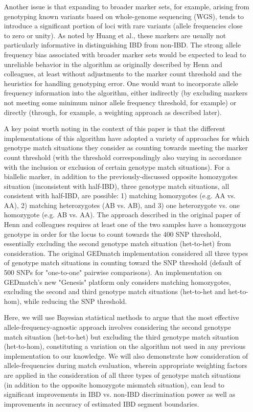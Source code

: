 \documentclass{article}
\begin{document}
Another issue is that expanding to broader marker sets, for example, arising from genotyping known variants based on whole-genome sequencing (WGS), tends to introduce a significant portion of loci with rare variants (allele frequencies close to zero or unity). As noted by Huang et al.,\citep{speeDB} these markers are usually not particularly informative in distinguishing IBD from non-IBD. The strong allele frequency bias associated with broader marker sets would be expected to lead to unreliable behavior in the algorithm as originally described by Henn and colleagues, at least without adjustments to the marker count threshold and the heuristics for handling genotyping error. One would want to incorporate allele frequency information into the algorithm, either indirectly (by excluding markers not meeting some minimum minor allele frequency threshold, for example) or directly (through, for example, a weighting approach as described later).

A key point worth noting in the context of this paper is that the different implementations of this algorithm have adopted a variety of approaches for which genotype match situations they consider as counting towards meeting the marker count threshold (with the threshold correspondingly also varying in accordance with the inclusion or exclusion of certain genotype match situations). For a biallelic marker, in addition to the previously-discussed opposite homozygotes situation (inconsistent with half-IBD), three genotype match situations, all consistent with half-IBD, are possible: 1) matching homozygotes (e.g. AA vs. AA), 2) matching heterozygotes (AB vs. AB), and 3) one heterozygote vs. one homozygote (e.g. AB vs. AA). The approach described in the original paper of Henn and colleagues requires at least one of the two samples have a homozygous genotype in order for the locus to count towards the 400 SNP threshold, essentially excluding the second genotype match situation (het-to-het) from consideration. The original GEDmatch implementation considered all three types of genotype match situations in counting toward the SNP threshold (default of 500 SNPs for "one-to-one" pairwise comparisons). An implementation on GEDmatch's new "Genesis" platform only considers matching homozygotes, excluding the second and third genotype match situations (het-to-het and het-to-hom), while reducing the SNP threshold.

Here, we will use Bayesian statistical methods to argue that the most effective allele-frequency-agnostic approach involves considering the second genotype match situation (het-to-het) but excluding the third genotype match situation (het-to-hom), constituting a variation on the algorithm not used in any previous implementation to our knowledge. We will also demonstrate how consideration of allele-frequencies during match evaluation, wherein appropriate weighting factors are applied in the consideration of all three types of genotype match situations (in addition to the opposite homozygote mismatch situation), can lead to significant improvements in IBD vs. non-IBD discrimination power as well as improvements in accuracy of estimated IBD segment boundaries.
\end{document}
